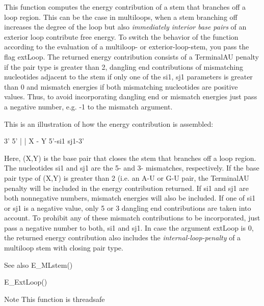 This function computes the energy contribution of a stem that branches off a loop region. This can be the case in multiloops, when a stem branching off increases the degree of the loop but also {\itshape immediately interior base pairs} of an exterior loop contribute free energy. To switch the behavior of the function according to the evaluation of a multiloop-\/ or exterior-\/loop-\/stem, you pass the flag \textquotesingle{}ext\+Loop\textquotesingle{}. The returned energy contribution consists of a Terminal\+AU penalty if the pair type is greater than 2, dangling end contributions of mismatching nucleotides adjacent to the stem if only one of the si1, sj1 parameters is greater than 0 and mismatch energies if both mismatching nucleotides are positive values. Thus, to avoid incorporating dangling end or mismatch energies just pass a negative number, e.\+g. -\/1 to the mismatch argument.

This is an illustration of how the energy contribution is assembled\+: 
\begin{DoxyPre}
      3'  5'
      |   |
      X - Y
5'-si1     sj1-3'
\end{DoxyPre}


Here, (X,Y) is the base pair that closes the stem that branches off a loop region. The nucleotides si1 and sj1 are the 5\textquotesingle{}-\/ and 3\textquotesingle{}-\/ mismatches, respectively. If the base pair type of (X,Y) is greater than 2 (i.\+e. an A-\/U or G-\/U pair, the Terminal\+AU penalty will be included in the energy contribution returned. If si1 and sj1 are both nonnegative numbers, mismatch energies will also be included. If one of si1 or sj1 is a negative value, only 5\textquotesingle{} or 3\textquotesingle{} dangling end contributions are taken into account. To prohibit any of these mismatch contributions to be incorporated, just pass a negative number to both, si1 and sj1. In case the argument ext\+Loop is 0, the returned energy contribution also includes the {\itshape internal-\/loop-\/penalty} of a multiloop stem with closing pair type.

\begin{DoxySeeAlso}{See also}
E\+\_\+\+M\+Lstem() 

E\+\_\+\+Ext\+Loop() 
\end{DoxySeeAlso}
\begin{DoxyNote}{Note}
This function is threadsafe
\end{DoxyNote}

